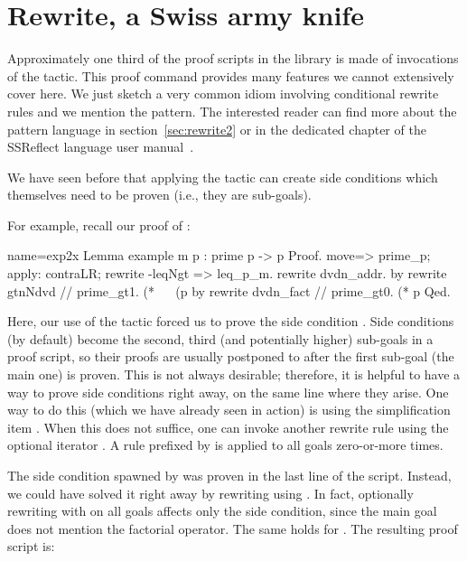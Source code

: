 \section{Rewrite, a Swiss army knife}\label{sec:rewrite}

Approximately one third of the proof scripts in the \mcbMC{} library is made of
invocations of the  tactic. This proof command provides many
features we cannot extensively cover here.  We just sketch a very common idiom
involving conditional rewrite rules and we mention the  pattern.
The interested reader can find more about the pattern
language in section~\ref{sec:rewrite2} or in the dedicated chapter of
the SSReflect language user manual~\cite{ssrman}.


We have seen before that applying the  tactic can
create side conditions which themselves need to be proven (i.e., they
are sub-goals).

For example, recall our proof of :

\begin{coq}{name=exp2x}{}
Lemma example m p : prime p -> p %
Proof.
move=> prime_p; apply: contraLR; rewrite -leqNgt => leq_p_m.
rewrite dvdn_addr.
  by rewrite gtnNdvd // prime_gt1. (* ~~ (p %
by rewrite dvdn_fact // prime_gt0. (* p %
Qed.
\end{coq}

Here, our use of the  tactic forced us to prove
the side condition .
Side conditions (by default) become the second, third (and potentially
higher) sub-goals in a proof script, so their proofs are usually postponed to
after the first sub-goal (the main one) is proven. This is not always
desirable; therefore, it is helpful to have a way to prove
side conditions right away, on the same line where they arise.
One way to do this (which we have already seen in action) is using the
simplification item \C{//}.
When this does not suffice, one can invoke another rewrite rule using
the optional iterator .  A rule prefixed by  is applied to
all goals zero-or-more times.

The side condition  spawned by  was
proven in the last line of the script. Instead, we could have solved
it right away by rewriting using .
In fact, optionally rewriting with  on all goals affects only
the side condition, since the main goal does not mention the
factorial operator.
The same holds for . The resulting proof script is:

